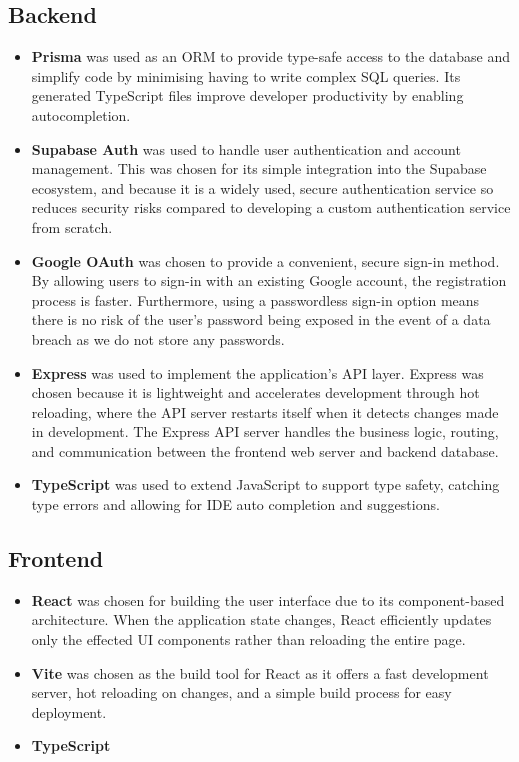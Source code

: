 \documentclass{vgtc}                          %
\begin{document}
\subsection{Backend}
\begin{itemize}
    \item \textbf{Prisma} was used as an ORM to provide type-safe access to the database and simplify code by minimising having to write complex SQL queries. Its generated TypeScript files improve developer productivity by enabling autocompletion.
    \item \textbf{Supabase Auth} was used to handle user authentication and account management. This was chosen for its simple integration into the Supabase ecosystem, and because it is a widely used, secure authentication service so reduces security risks compared to developing a custom authentication service from scratch.
    \item \textbf{Google OAuth} was chosen to provide a convenient, secure sign-in method. By allowing users to sign-in with an existing Google account, the registration process is faster. Furthermore, using a passwordless sign-in option means there is no risk of the user's password being exposed in the event of a data breach as we do not store any passwords.
    \item \textbf{Express} was used to implement the application's API layer. Express was chosen because it is lightweight and accelerates development through hot reloading, where the API server restarts itself when it detects changes made in development. The Express API server handles the business logic, routing, and communication between the frontend web server and backend database.
    \item \textbf{TypeScript} was used to extend JavaScript to support type safety, catching type errors and allowing for IDE auto completion and suggestions.
\end{itemize}

\subsection{Frontend}
\begin{itemize}
    \item \textbf{React} was chosen for building the user interface due to its component-based architecture. When the application state changes, React efficiently updates only the effected UI components rather than reloading the entire page.
    \item \textbf{Vite} was chosen as the build tool for React as it offers a fast development server, hot reloading on changes, and a simple build process for easy deployment.
    \item \textbf{TypeScript}
\end{itemize}
\end{document}
